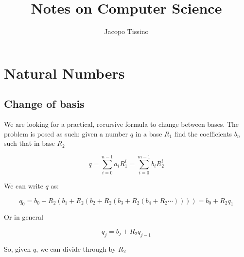 \documentclass[12pt,a4paper]{report}
\author{Jacopo Tissino}
\title{Notes on Computer Science}
\numberwithin{equation}{section}
\theoremstyle{definition}
\theoremstyle{remark}
\begin{document}
\maketitle

\chapter{Natural Numbers}

\section{Change of basis}

We are looking for a practical, recursive formula to change between bases. The problem is posed as such: given a number $q$ in a base $R_1$ find the coefficients $b_n$ such that in base $R_2$

\begin{equation}
q = \sum_{i=0}^{n-1} a_i R_1^i = \sum_{i=0}^{m-1} b_i R_2^i
\end{equation}

We can write $q$ as:

\begin{equation}
q_0 = b_0 +  R_2 \left( b_1 + R_2 \left( b_2 + R_2 \left( b_3 + R_2 \left( b_4 + R_2 \cdots \right)\right)\right)\right) = b_0 + R_2 q_1
\end{equation}

Or in general

\begin{equation}
q_j = b_j + R_2 q_{j-1}
\end{equation}

So, given $q$, we can divide through by $R_2$ 

\tableofcontents
\end{document}
